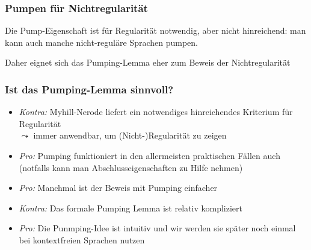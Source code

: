 \documentclass[aspectratio=1610,onlymath]{beamer}
\begin{document}
\begin{frame}[t]\frametitle{Pumpen für Nichtregularität}

Die Pump-Eigenschaft ist für Regularität \alert{notwendig}, aber \alert{nicht hinreichend}: man kann auch manche nicht-reguläre Sprachen pumpen.
\medskip

Daher eignet sich das Pumping-Lemma eher zum Beweis der Nichtregularität
\medskip\pause


\end{frame}


\begin{frame}\frametitle{Ist das Pumping-Lemma sinnvoll?}

\begin{itemize}
\item \emph{Kontra:} Myhill-Nerode liefert ein notwendiges  hinreichendes Kriterium für Regularität\\
$\leadsto$ immer anwendbar, um (Nicht-)Regularität zu zeigen
\item \emph{Pro:} Pumping funktioniert in den allermeisten praktischen Fällen auch\\
(notfalls kann man Abschlusseigenschaften zu Hilfe nehmen)
\item \emph{Pro:} Manchmal ist der Beweis mit Pumping einfacher
\item \emph{Kontra:} Das formale Pumping Lemma ist relativ kompliziert
\item \emph{Pro:} Die Punmping-Idee ist intuitiv und wir werden sie später noch einmal bei kontextfreien Sprachen nutzen
\end{itemize}

\end{frame}


\end{document}
